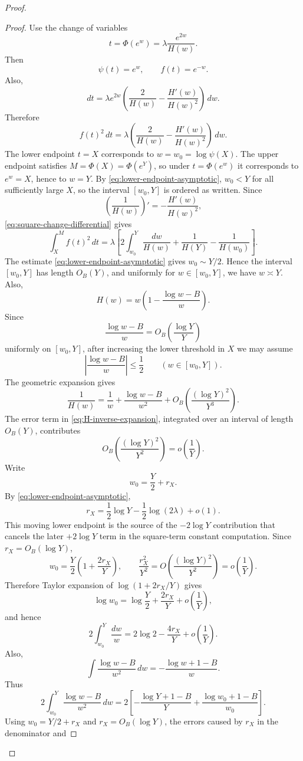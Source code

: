 \documentclass[11pt]{article}
\begin{document}
\begin{proof}
\begin{proof}
Use the change of variables
\[
t=\Phi(e^w)=\lambda\frac{e^{2w}}{H(w)}.
\]
Then
\[
\psi(t)=e^w,
\qquad
f(t)=e^{-w}.
\]
Also,
\[
dt=\lambda e^{2w}\left(\frac2{H(w)}-\frac{H'(w)}{H(w)^2}\right)\,dw.
\]
Therefore
\[
f(t)^2\,dt
=
\lambda\left(\frac2{H(w)}-\frac{H'(w)}{H(w)^2}\right)\,dw.
\tag{24}\label{eq:square-change-differential}
\]
The lower endpoint $t=X$ corresponds to $w=w_0=\log\psi(X)$. The upper endpoint satisfies
$M=\Phi(X)=\Phi(e^Y)$, so under $t=\Phi(e^w)$ it corresponds to $e^w=X$, hence to $w=Y$. By
\eqref{eq:lower-endpoint-asymptotic}, $w_0<Y$ for all sufficiently large $X$, so the interval
$[w_0,Y]$ is ordered as written. Since
\[
\left(\frac1{H(w)}\right)'=-\frac{H'(w)}{H(w)^2},
\]
\eqref{eq:square-change-differential} gives
\[
\int_X^M f(t)^2\,dt
=
\lambda\left[
2\int_{w_0}^Y\frac{dw}{H(w)}
+
\frac1{H(Y)}-
\frac1{H(w_0)}
\right].
\tag{25}\label{eq:square-integral-exact}
\]
The estimate \eqref{eq:lower-endpoint-asymptotic} gives $w_0\sim Y/2$. Hence the interval
$[w_0,Y]$ has length $O_B(Y)$, and uniformly for $w\in[w_0,Y]$, we have $w\asymp Y$. Also,
\[
H(w)=w\left(1-\frac{\log w-B}{w}\right).
\]
Since
\[
\frac{\log w-B}{w}=O_B\left(\frac{\log Y}{Y}\right)
\]
uniformly on $[w_0,Y]$, after increasing the lower threshold in $X$ we may assume
\[
\left|\frac{\log w-B}{w}\right|\le \frac12
\qquad(w\in[w_0,Y]).
\]
The geometric expansion gives
\[
\frac1{H(w)}
=
\frac1w+
\frac{\log w-B}{w^2}
+
O_B\left(\frac{(\log Y)^2}{Y^3}\right).
\tag{26}\label{eq:H-inverse-expansion}
\]
The error term in \eqref{eq:H-inverse-expansion}, integrated over an interval of length $O_B(Y)$,
contributes
\[
O_B\left(\frac{(\log Y)^2}{Y^2}\right)=o\left(\frac1Y\right).
\]
Write
\[
w_0=\frac Y2+r_X.
\]
By \eqref{eq:lower-endpoint-asymptotic},
\[
r_X=
\frac12\log Y-\frac12\log(2\lambda)+o(1).
\tag{27}\label{eq:rX-asymptotic}
\]
This moving lower endpoint is the source of the $-2\log Y$ contribution that cancels the later
$+2\log Y$ term in the square-term constant computation.
Since $r_X=O_B(\log Y)$,
\[
w_0=\frac Y2\left(1+\frac{2r_X}{Y}\right),
\qquad
\frac{r_X^2}{Y^2}=O\left(\frac{(\log Y)^2}{Y^2}\right)=o\left(\frac1Y\right).
\]
Therefore Taylor expansion of $\log(1+2r_X/Y)$ gives
\[
\log w_0=
\log\frac Y2+
\frac{2r_X}{Y}+
o\left(\frac1Y\right),
\]
and hence
\[
2\int_{w_0}^Y\frac{dw}{w}
=
2\log 2-
\frac{4r_X}{Y}+
o\left(\frac1Y\right).
\]
Also,
\[
\int \frac{\log w-B}{w^2}\,dw
=
-\frac{\log w+1-B}{w}.
\]
Thus
\[
2\int_{w_0}^Y\frac{\log w-B}{w^2}\,dw
=
2\left[
-\frac{\log Y+1-B}{Y}
+
\frac{\log w_0+1-B}{w_0}
\right].
\]
Using $w_0=Y/2+r_X$ and $r_X=O_B(\log Y)$, the errors caused by $r_X$ in the denominator and

\end{proof}
\end{proof}
\end{document}
